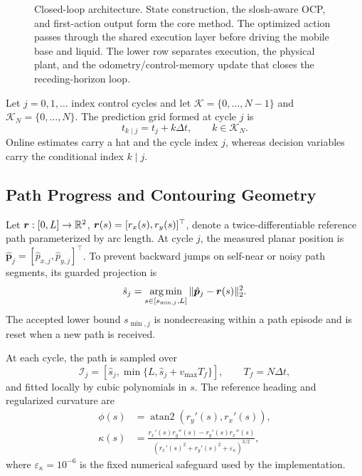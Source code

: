 \begin{figure}[t]
  \caption{Closed-loop \SMPCC{} architecture. State construction, the
  slosh-aware OCP, and first-action output form the core method. The optimized
  action passes through the shared execution layer before driving the mobile
  base and liquid. The lower row separates execution, the physical plant, and
  the odometry/control-memory update that closes the receding-horizon loop.}
  \label{fig:core_architecture}
\end{figure}

Let \(j=0,1,\ldots\) index control cycles and let
\(\mathcal K=\{0,\ldots,N-1\}\) and
\(\mathcal K_N=\{0,\ldots,N\}\). The prediction grid formed at cycle \(j\) is
\[
  t_{k\mid j}=t_j+k\Delta t,\qquad k\in\mathcal K_N.
\]
Online estimates carry a hat and the cycle index \(j\), whereas decision
variables carry the conditional index \(k\mid j\).

\subsection{Path Progress and Contouring Geometry}

Let
\(\bm{r}:[0,L]\rightarrow\mathbb R^2\),
\(\bm{r}(s)=[r_x(s),r_y(s)]^\top\), denote a twice-differentiable reference path
parameterized by arc length. At cycle \(j\), the measured planar position is
\(\hat{\bm p}_j=[\hat p_{x,j},\hat p_{y,j}]^\top\). To prevent backward jumps
on self-near or noisy path segments, its guarded projection is
\begin{equation}
  \hat s_j
  =\operatorname*{arg\,min}_{s\in[s_{\min,j},L]}
  \|\hat{\bm p}_j-\bm{r}(s)\|_2^2.
  \label{eq:guarded_projection}
\end{equation}
The accepted lower bound \(s_{\min,j}\) is nondecreasing within a path episode
and is reset when a new path is received.

At each cycle, the path is sampled over
\[
  \mathcal I_j
  =[\hat s_j,\min\{L,\hat s_j+v_{\max}T_f\}],
  \qquad T_f=N\Delta t,
\]
and fitted locally by cubic polynomials in \(s\). The reference heading and
regularized curvature are
\begin{equation}
\begin{aligned}
  \phi(s)
  &=\operatorname{atan2}\!\left(r_y'(s),r_x'(s)\right),\\
  \kappa(s)
  &=\frac{r_x'(s)r_y''(s)-r_y'(s)r_x''(s)}
  {\left(r_x'(s)^2+r_y'(s)^2+\varepsilon_\kappa\right)^{3/2}},
\end{aligned}
\label{eq:path_heading_curvature}
\end{equation}
where \(\varepsilon_\kappa=10^{-6}\) is the fixed numerical safeguard used by
the implementation.

